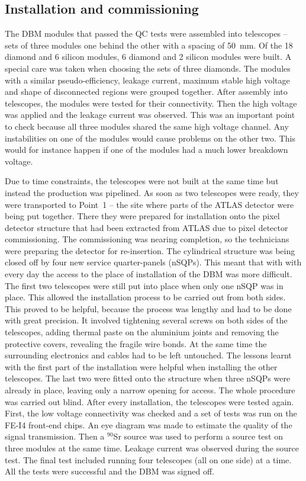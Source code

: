 \subsection{Installation and commissioning}
The DBM modules that passed the QC tests were assembled into telescopes -- sets of three modules one behind the other with a spacing of 50~mm. Of the 18 diamond and 6 silicon modules, 6 diamond and 2 silicon modules were built. A special care was taken when choosing the sets of three diamonds. The modules with a similar pseudo-efficiency, leakage current, maximum stable high voltage and shape of disconnected regions were grouped together. After assembly into telescopes, the modules were tested for their connectivity. Then the high voltage was applied and the leakage current was observed. This was an important point to check because all three modules shared the same high voltage channel. Any instabilities on one of the modules would cause problems on the other two. This would for instance happen if one of the modules had a much lower breakdown voltage.

Due to time constraints, the telescopes were not built at the same time but instead the production was pipelined. As soon as two telescopes were ready, they were transported to Point~1 -- the site where parts of the ATLAS detector were being put together. There they were prepared for installation onto the pixel detector structure that had been extracted from ATLAS due to pixel detector commissioning. The commissioning was nearing completion, so the technicians were preparing the detector for re-insertion. The cylindrical structure was being closed off by four new service quarter-panels (nSQPs). This meant that with with every day the access to the place of installation of the DBM was more difficult. The first two telescopes were still put into place when only one nSQP was in place. This allowed the installation process to be carried out from both sides. This proved to be helpful, because the process was lengthy and had to be done with great precision. It involved tightening several screws on both sides of the telescopes, adding thermal paste on the aluminium joints and removing the protective covers, revealing the fragile wire bonds. At the same time the surrounding electronics and cables had to be left untouched. The lessons learnt with the first part of the installation were helpful when installing the other telescopes. The last two were fitted onto the structure when three nSQPs were already in place, leaving only a narrow opening for access. The whole procedure was carried out blind. After every installation, the telescopes were tested again. First, the low voltage connectivity was checked and a set of tests was run on the FE-I4 front-end chips. An eye diagram was made to estimate the quality of the signal transmission. Then a $^{90}$Sr source was used to perform a source test on three modules at the same time. Leakage current was observed during the source test. The final test included running four telescopes (all on one side) at a time. All the tests were successful and the DBM was signed off.


